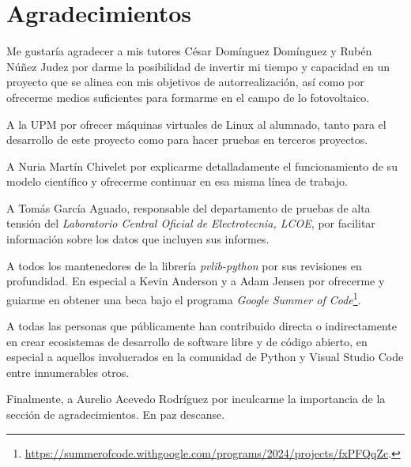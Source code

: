 \chapter*{Agradecimientos} \label{chp:agrad}

Me gustaría agradecer a mis tutores César Domínguez Domínguez y Rubén Núñez Judez por darme la posibilidad de invertir mi tiempo y capacidad en un proyecto que se alinea con mis objetivos de autorrealización, así como por ofrecerme medios suficientes para formarme en el campo de lo fotovoltaico.

A la UPM por ofrecer máquinas virtuales de Linux al alumnado, tanto para el desarrollo de este proyecto como para hacer pruebas en terceros proyectos.

A Nuria Martín Chivelet por explicarme detalladamente el funcionamiento de su modelo científico y ofrecerme continuar en esa misma línea de trabajo.

A Tomás García Aguado, responsable del departamento de pruebas de alta tensión del \textit{Laboratorio Central Oficial de Electrotecnia, LCOE}, por facilitar información sobre los datos que incluyen sus informes.

A todos los mantenedores de la librería \textit{pvlib-python} por sus revisiones en profundidad. En especial a Kevin Anderson y a Adam Jensen por ofrecerme y guiarme en obtener una beca bajo el programa \textit{Google Summer of Code}\footnote{\url{https://summerofcode.withgoogle.com/programs/2024/projects/fxPFQqZc}.}.

A todas las personas que públicamente han contribuido directa o indirectamente en crear ecosistemas de desarrollo de software libre y de código abierto, en especial a aquellos involucrados en la comunidad de Python y Visual Studio Code entre innumerables otros.

Finalmente, a Aurelio Acevedo Rodríguez por inculcarme la importancia de la sección de agradecimientos. En paz descanse.

